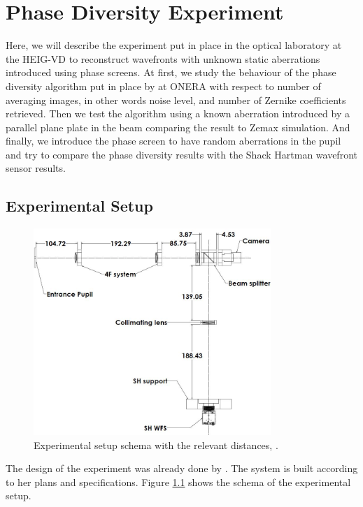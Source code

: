 
\chapter{Phase Diversity Experiment} 
\label{ch:PDExp}

Here, we will describe the experiment put in place in the optical laboratory at the HEIG-VD to reconstruct wavefronts with unknown static aberrations introduced using phase screens. At first, we study the  behaviour of the phase diversity algorithm put in place by \citet{mugnier_2006} at ONERA with respect to number of averaging images, in other words noise level, and number of Zernike coefficients retrieved. Then we test the algorithm using a known aberration introduced by a parallel plane plate in the beam comparing the result to Zemax simulation. And finally, we introduce the phase screen to have random aberrations in the pupil and try to compare the phase diversity results with the Shack Hartman wavefront sensor results.

\section{Experimental Setup}
\label{sec:ExpSetup}
\begin{figure}
\begin{center}
\includegraphics[width=0.8\textwidth,angle=0]{Figures/setupSchema.JPG}
\decoRule
\caption[Experimental Setup Schema]{Experimental setup schema with the relevant distances, \citep{Bouxin_PDM}.}
\label{fig:setupSchema}
\end{center}
\end{figure}

The design of the experiment was already done by \citet{Bouxin_PDM}. The system is built according to her plans and specifications. Figure \ref{fig:setupSchema} shows the schema of the experimental setup.

